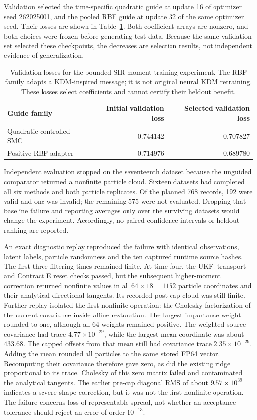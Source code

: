 Validation selected the time-specific quadratic guide at update 16 of
optimizer seed 262025001, and the pooled RBF guide at update 32 of the same
optimizer seed. Their losses are shown in
Table~\ref{tab:sg-moment-training-selection}. Both coefficient arrays are
nonzero, and both choices were frozen before generating test data. Because
the same validation set selected these checkpoints, the decreases are
selection results, not independent evidence of generalization.

\begin{table}[htbp]
\centering
\begin{tabular}{lrr}
\toprule
Guide family & Initial validation loss & Selected validation loss\\
\midrule
Quadratic controlled SMC & 0.744142 & 0.707827\\
Positive RBF adapter & 0.714976 & 0.689780\\
\bottomrule
\end{tabular}
\caption{Validation losses for the bounded SIR moment-training experiment.
The RBF family adapts a KDM-inspired message; it is not original neural KDM
retraining. These losses select coefficients and cannot certify their
heldout benefit.}
\label{tab:sg-moment-training-selection}
\end{table}

Independent evaluation stopped on the seventeenth dataset because the
unguided comparator returned a nonfinite particle cloud. Sixteen datasets
had completed all six methods and both particle replicates. Of the planned
768 records, 192 were valid and one was invalid; the remaining 575 were not
evaluated. Dropping that baseline failure and reporting averages only over
the surviving datasets would change the experiment. Accordingly, no paired
confidence intervals or heldout ranking are reported.

An exact diagnostic replay reproduced the failure with identical observations,
latent labels, particle randomness and the ten captured runtime source hashes.
The first three filtering times remained finite. At time four, the UKF,
transport and Contract E reset checks passed, but the subsequent higher-moment
correction returned nonfinite values in all $64\times18=1152$ particle
coordinates and their analytical directional tangents. Its recorded post-cap
cloud was still finite. Further replay isolated the first nonfinite operation:
the Cholesky factorization of the current covariance inside affine restoration.
The largest importance weight rounded to one, although all 64 weights remained
positive. The weighted source covariance had trace $4.77\times10^{-29}$,
while the largest mean coordinate was about $433.68$. The capped offsets from
that mean still had covariance trace $2.35\times10^{-29}$. Adding the mean
rounded all particles to the same stored FP64 vector. Recomputing their
covariance therefore gave zero, as did the existing ridge proportional to its
trace. Cholesky of this zero matrix failed and contaminated the analytical
tangents. The earlier pre-cap diagonal RMS of about $9.57\times10^{39}$
indicates a severe shape correction, but it was not the first nonfinite
operation. The failure concerns loss of representable spread, not whether
an acceptance tolerance should reject an error of order $10^{-13}$.

